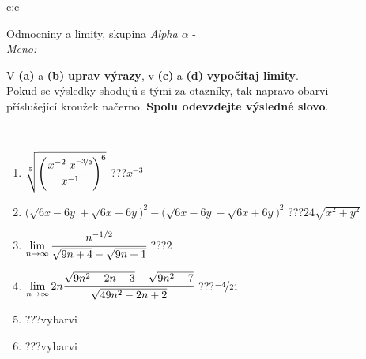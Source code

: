 \documentclass[10pt]{report}
\begin{document}
\thispagestyle{empty}
\begin{tabular}{c:c}
\begin{minipage}[c][104.5mm][t]{0.5\linewidth}
\begin{center}
\vspace{7mm}
{\huge Odmocniny a limity, skupina \textit{Alpha $\alpha$} -}\\[5mm]
\textit{Meno:}\phantom{xxxxxxxxxxxxxxxxxxxxxxxxxxxxxxxxxxxxxxxxxxxxxxxxxxxxxxxxxxxxxxxxx}\\[5mm]
\begin{minipage}{0.95\linewidth}
\begin{center}
V \textbf{(a)} a \textbf{(b)} \textbf{uprav výrazy}, v \textbf{(c)} a \textbf{(d)} \textbf{vypočítaj limity}.\\Pokud se výsledky shodujú s tými za otazníky, tak napravo obarvi\\příslušející kroužek načerno. \textbf{Spolu odevzdejte výsledné slovo}.
\end{center}
\end{minipage}
\\[1mm]
\begin{minipage}{0.79\linewidth}
\begin{center}
\begin{varwidth}{\linewidth}
\begin{enumerate}
\small
\item $\sqrt[5]{\left(\cfrac{x^{-2}\;x^{\nicefrac{-3}{2}}}{x^{-1}}\right)^{6}}$\quad \dotfill\; ???\;\dotfill \quad $x^{-3}$
\item {\footnotesize{\scriptsize$\big(\sqrt{6x-6y}+\sqrt{6x+6y}\big)^2-\big(\sqrt{6x-6y}-\sqrt{6x+6y}\big)^2$}\quad \dotfill\; ???\;\dotfill \quad $24\sqrt{x^2+y^2}$}
\item $\lim\limits_{n\to\infty}\cfrac{n^{-1/2}}{\sqrt{9n+4}-\sqrt{9n+1}}$\quad \dotfill\; ???\;\dotfill \quad $2$
\item $\lim\limits_{n\to\infty}2n\cfrac{\sqrt{9n^2-2n-3}-\sqrt{9n^2-7}}{\sqrt{49n^2-2n+2}}$\quad \dotfill\; ???\;\dotfill \quad $\nicefrac{-4}{21}$
\item \quad \dotfill\; ???\;\dotfill \quad vybarvi
\item \quad \dotfill\; ???\;\dotfill \quad vybarvi
\end{enumerate}
\end{varwidth}
\end{center}
\end{minipage}
\begin{minipage}{0.20\linewidth}

\end{minipage}
\end{center}
\end{minipage}
\end{tabular}
\end{document}
